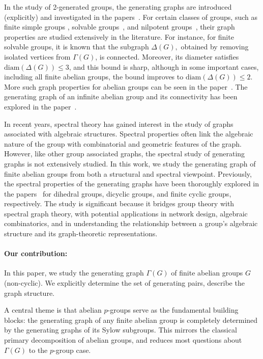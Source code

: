 \documentclass[11pt]{article}
\begin{document}
In the study of 2-generated groups, the generating graphs are introduced (explicitly) and investigated in the papers~\cite{some,clique}. For certain classes of groups, such as finite simple groups \cite{Lieback,Guralnick}, solvable groups~\cite{generating,diameter}, and nilpotent groups~\cite{Connectivity}, their graph properties are studied extensively in the literature. For instance, for finite solvable groups, it is known that the subgraph $\Delta(G),$ obtained by removing isolated vertices from $\Gamma(G)$, is connected. Moreover, its diameter satisfies $\mathrm{diam}(\Delta(G)) \leq 3$, and this bound is sharp, although in some important cases, including all finite abelian groups, the bound improves to $\mathrm{diam}(\Delta(G)) \leq 2$. More such graph properties for abelian groups can be seen in the paper~\cite{Connectivity}. The generating graph of an infinite abelian group and its connectivity has been explored in the paper~\cite{infinite}. 


In recent years, spectral theory has gained interest in the study of graphs associated with algebraic structures. Spectral properties often link the algebraic nature of the group with combinatorial and geometric features of the graph. However, like other group associated graphs, the spectral study of generating graphs is not extensively studied.  In this work, we study the generating graph of finite abelian groups from both a structural and spectral viewpoint. Previously, the spectral properties of the generating graphs have been thoroughly explored in the papers~\cite{Me1,Me2,Me} for dihedral groups, dicyclic groups, and finite cyclic groups, respectively.  The study is significant because it bridges group theory with spectral graph theory, with potential applications in network design, algebraic combinatorics, and in understanding the relationship between a group's algebraic structure and its graph-theoretic representations.

\paragraph*{Our contribution:} In this paper, we study the generating graph $\Gamma(G)$ of finite abelian 
groups $G$ (non-cyclic). We explicitly determine the set of generating pairs, describe the graph 
structure.

A central theme is that abelian $p$-groups serve as the fundamental building 
blocks: the generating graph of any finite abelian group is completely 
determined by the generating graphs of its Sylow subgroups. This mirrors the 
classical primary decomposition of abelian groups, and reduces most questions 
about $\Gamma(G)$ to the $p$-group case.
\end{document}
